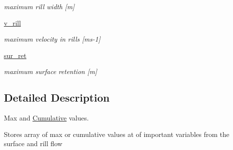 \begin{DoxyCompactItemize}
\begin{DoxyCompactList}\small\item\em maximum rill width \mbox{[}m\mbox{]} \end{DoxyCompactList}\item 
\hypertarget{classmain__src_8old_1_1main__classes_1_1CumulativeMax_1_1Cumulative_afabdf99f5faa4b04e4704e9a167391fd}{\hyperlink{classmain__src_8old_1_1main__classes_1_1CumulativeMax_1_1Cumulative_afabdf99f5faa4b04e4704e9a167391fd}{v\-\_\-rill}}\label{classmain__src_8old_1_1main__classes_1_1CumulativeMax_1_1Cumulative_afabdf99f5faa4b04e4704e9a167391fd}

\begin{DoxyCompactList}\small\item\em maximum velocity in rills \mbox{[}ms-\/1\mbox{]} \end{DoxyCompactList}\item 
\hypertarget{classmain__src_8old_1_1main__classes_1_1CumulativeMax_1_1Cumulative_ad28ec3832e4037c325809069e1bfe269}{\hyperlink{classmain__src_8old_1_1main__classes_1_1CumulativeMax_1_1Cumulative_ad28ec3832e4037c325809069e1bfe269}{sur\-\_\-ret}}\label{classmain__src_8old_1_1main__classes_1_1CumulativeMax_1_1Cumulative_ad28ec3832e4037c325809069e1bfe269}

\begin{DoxyCompactList}\small\item\em maximum surface retention \mbox{[}m\mbox{]} \end{DoxyCompactList}\end{DoxyCompactItemize}


\subsection{Detailed Description}
Max and \hyperlink{classmain__src_8old_1_1main__classes_1_1CumulativeMax_1_1Cumulative}{Cumulative} values. 

Stores array of max or cumulative values at of important variables from the surface and rill flow 

